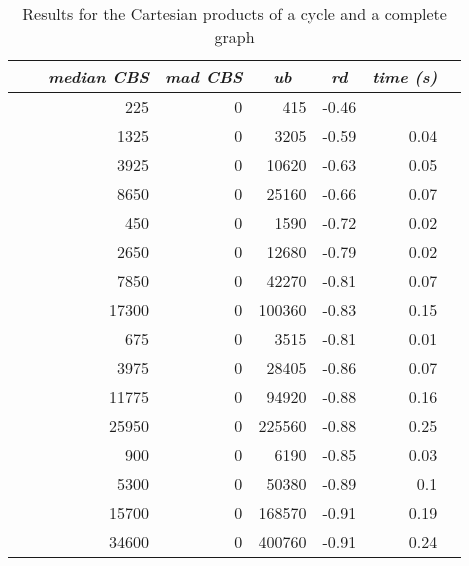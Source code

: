 \documentclass{scrartcl}
\theoremstyle{plain}
\newcommand{\cbs}{CBS}
\begin{document}
\begin{table}[!ht]
	\centering
	\scriptsize
	\begin{tabular}{|ll|rr|r|r|r|r|} 
	\hline
	\multicolumn{1}{|c}{} &
	\multicolumn{1}{c|}{} &
	\multicolumn{1}{c}{\emph{median \cbs{}}} &
	\multicolumn{1}{c|}{\emph{mad \cbs{}}} &
	\multicolumn{1}{c|}{\emph{ub}} &
	\multicolumn{1}{c|}{\emph{rd}} &
	\multicolumn{1}{c|}{\emph{time (s)}} \\ \hline
		
	\makeatletter{} &  & 225 & 0 & 415 & -0.46 &  \\ 
 &  & 1325 & 0 & 3205 & -0.59 & 0.04 \\ 
 &  & 3925 & 0 & 10620 & -0.63 & 0.05 \\ 
 &  & 8650 & 0 & 25160 & -0.66 & 0.07 \\ 
 &  & 450 & 0 & 1590 & -0.72 & 0.02 \\ 
 &  & 2650 & 0 & 12680 & -0.79 & 0.02 \\ 
 &  & 7850 & 0 & 42270 & -0.81 & 0.07 \\ 
 &  & 17300 & 0 & 100360 & -0.83 & 0.15 \\ 
 &  & 675 & 0 & 3515 & -0.81 & 0.01 \\ 
 &  & 3975 & 0 & 28405 & -0.86 & 0.07 \\ 
 &  & 11775 & 0 & 94920 & -0.88 & 0.16 \\ 
 &  & 25950 & 0 & 225560 & -0.88 & 0.25 \\ 
 &  & 900 & 0 & 6190 & -0.85 & 0.03 \\ 
 &  & 5300 & 0 & 50380 & -0.89 & 0.1 \\ 
 &  & 15700 & 0 & 168570 & -0.91 & 0.19 \\ 
 &  & 34600 & 0 & 400760 & -0.91 & 0.24 \\ 
 
	
	\hline
	\end{tabular}
	\caption{\label{tab:cart_ck_perf}Results for the Cartesian products of a 
cycle and a complete 
graph}

\end{table}
\end{document}
